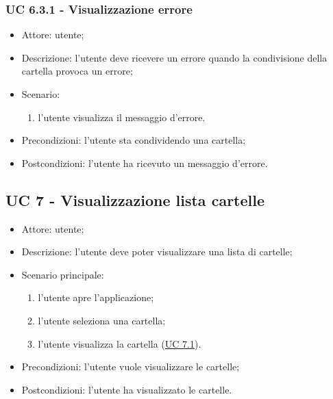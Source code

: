     \subsubsection{UC 6.3.1 - Visualizzazione errore } \label{sec: UC 6.3.1}
    \begin{itemize}
        \item Attore: utente;
        \item Descrizione: l'utente deve ricevere un errore quando la condivisione della cartella provoca un errore;
        \item Scenario:
        \begin{enumerate}
        \item l'utente visualizza il messaggio d'errore.
        \end{enumerate}   
        \item Precondizioni: l'utente sta condividendo una cartella;
        \item Postcondizioni: l'utente ha ricevuto un messaggio d'errore.
    \end{itemize}

    \subsection{UC 7 - Visualizzazione lista cartelle}
    \begin{itemize}
        \item Attore: utente;
        \item Descrizione: l'utente deve poter visualizzare una lista di cartelle;
        \item Scenario principale:
            \begin{enumerate}
            \item l'utente apre l'applicazione;
            \item l'utente seleziona una cartella;
            \item l'utente visualizza la cartella (\hyperref[sec: UC 7.1]{UC 7.1}).
            \end{enumerate}
        \item Precondizioni: l'utente vuole visualizzare le cartelle;
        \item Postcondizioni: l'utente ha visualizzato le cartelle.
    \end{itemize}
